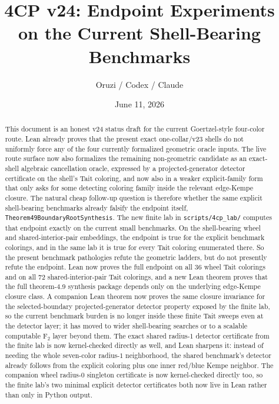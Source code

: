 \documentclass[11pt]{article}
\title{4CP v24: Endpoint Experiments on the Current Shell-Bearing Benchmarks}
\author{Oruzi / Codex / Claude}
\date{June 11, 2026}
\begin{document}
\maketitle
\sloppy

\begin{abstract}
This document is an honest v24 status draft for the current Goertzel-style
four-color route.  Lean already proves that the present exact one-collar/v23
shells do not uniformly force any of the four currently formalized geometric
oracle inputs.  The live route surface now also formalizes the remaining
non-geometric candidate as an exact-shell algebraic cancellation oracle,
expressed by a projected-generator detector certificate on the shell's Tait
coloring, and now also in a weaker explicit-family form that only asks for
some detecting coloring family inside the relevant edge-Kempe closure.  The
natural cheap follow-up question is therefore whether the same
explicit shell-bearing benchmarks already falsify the endpoint itself,
\verb|Theorem49BoundaryRootSynthesis|.  The new finite lab in
\verb|scripts/4cp_lab/| computes that endpoint exactly on the current small
benchmarks.  On the shell-bearing wheel and shared-interior-pair embeddings,
the endpoint is true for the explicit benchmark colorings, and in the same lab
it is true for every Tait coloring enumerated there.  So the present benchmark
pathologies refute the geometric ladders, but do not presently refute the
endpoint.  Lean now proves the full endpoint on all 36 wheel Tait colorings
and on all 72 shared-interior-pair Tait colorings, and a new Lean theorem
proves that the full theorem-4.9 synthesis package depends only on the
underlying edge-Kempe closure class.  A companion Lean theorem now proves the
same closure invariance for the selected-boundary projected-generator detector
property exposed by the finite lab, so the current benchmark burden is no
longer inside these finite Tait sweeps even at the detector layer; it has
moved to wider shell-bearing searches or to a scalable computable F$_2$ layer
beyond them.  The exact shared radius-$1$ detector certificate from the finite
lab is now kernel-checked directly as well, and Lean sharpens it: instead of
needing the whole seven-color radius-$1$ neighborhood, the shared benchmark's
detector already follows from the explicit coloring plus one inner red/blue
Kempe neighbor.  The companion wheel radius-$0$ singleton certificate is now
kernel-checked directly too, so the finite lab's two minimal explicit
detector certificates both now live in Lean rather than only in Python output.
\end{abstract}
\end{document}
